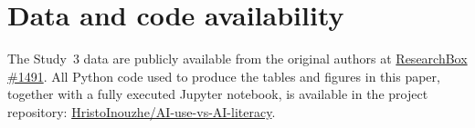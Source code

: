 \documentclass[11pt]{article}
\begin{document}
\section*{Data and code availability}

The Study~3 data are publicly available from the original authors at
\href{https://researchbox.org/1491}{ResearchBox \#1491}. All Python code used
to produce the tables and figures in this paper, together with a fully executed
Jupyter notebook, is available in the project repository:
\href{https://github.com/HristoInouzhe/AI-use-vs-AI-literacy}{HristoInouzhe/AI-use-vs-AI-literacy}.


\end{document}
